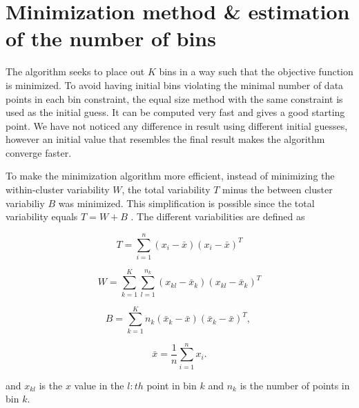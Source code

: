 \section{Minimization method \& estimation of the number of bins}
The algorithm seeks to place out $K$ bins in a way such that the objective function is minimized. To avoid having initial bins violating the minimal number of data points in each bin constraint, the equal size method with the same constraint is used as the initial guess. It can be computed very fast and gives a good starting point. We have not noticed any difference in result using different initial guesses, however an initial value that resembles the final result makes the algorithm converge faster.

\par
To make the minimization algorithm more efficient, instead of minimizing the within-cluster variability $W$, the total variability $T$ minus the between cluster variabiliy $B$ was minimized. This simplification is possible since the total variability equals $T=W+B$ \cite{Yan}. The different variabilities are defined as

\begin{equation}
	T = \sum_{i=1}^n  (x_{i} - \bar{x})(x_{i} - \bar{x})^T
	\label{eq:T}
\end{equation}

\begin{equation}
	W = \sum_{k=1}^K \sum_{l = 1}^{n_k} (x_{kl} - \bar{x}_k)(x_{kl} - \bar{x}_k)^T
	\label{eq:W}
\end{equation}

\begin{equation}
	B = \sum_{k=1}^K n_k (\bar{x}_k - \bar{x})(\bar{x}_k - \bar{x})^T,\
	\label{eq:B}
\end{equation}

\begin{equation}
 	\bar{x} = \frac{1}{n} \sum_{i=1}^n x_i.
\end{equation}

and $x_{kl}$ is the $x$ value in the $l:th$ point in bin $k$ and $n_k$ is the number of points in bin $k$.

